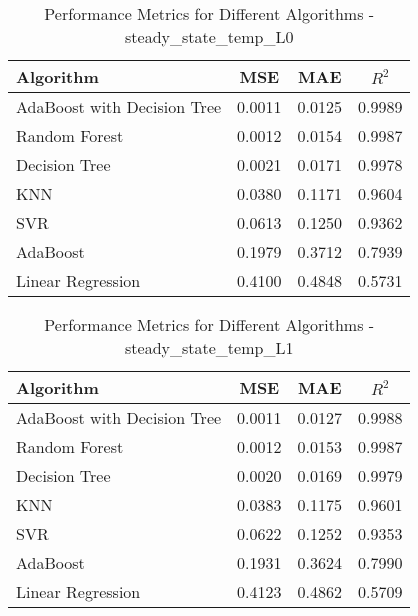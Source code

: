 \documentclass[conference]{IEEEtran}
\begin{document}
\begin{table}[ht]
	\centering
	\caption{Performance Metrics for Different Algorithms - steady\_state\_temp\_L0}
	\label{tab:steady_state_temp_L0}
	\begin{tabular}{lccc}
		\toprule
		\textbf{Algorithm} & \textbf{MSE} & \textbf{MAE} & \textbf{\(R^2\)} \\
		\midrule
		AdaBoost with Decision Tree & 0.0011 & 0.0125 & 0.9989 \\
		Random Forest & 0.0012 & 0.0154 & 0.9987 \\
		Decision Tree & 0.0021 & 0.0171 & 0.9978 \\
		KNN & 0.0380 & 0.1171 & 0.9604 \\
		SVR & 0.0613 & 0.1250 & 0.9362 \\
		AdaBoost & 0.1979 & 0.3712 & 0.7939 \\
		Linear Regression & 0.4100 & 0.4848 & 0.5731 \\
		\bottomrule
	\end{tabular}
\end{table}


\begin{table}[ht]
	\centering
	\caption{Performance Metrics for Different Algorithms - steady\_state\_temp\_L1}
	\label{tab:steady_state_temp_L1}
	\begin{tabular}{lccc}
		\toprule
		\textbf{Algorithm} & \textbf{MSE} & \textbf{MAE} & \textbf{\(R^2\)} \\
		\midrule
		AdaBoost with Decision Tree & 0.0011 & 0.0127 & 0.9988 \\
		Random Forest & 0.0012 & 0.0153 & 0.9987 \\
		Decision Tree & 0.0020 & 0.0169 & 0.9979 \\
		KNN & 0.0383 & 0.1175 & 0.9601 \\
		SVR & 0.0622 & 0.1252 & 0.9353 \\
		AdaBoost & 0.1931 & 0.3624 & 0.7990 \\
		Linear Regression & 0.4123 & 0.4862 & 0.5709 \\
		\bottomrule
	\end{tabular}
\end{table}
\end{document}
